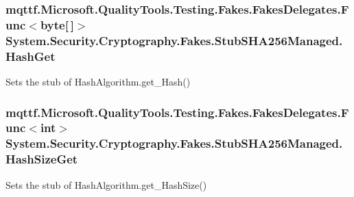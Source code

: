 \hypertarget{class_system_1_1_security_1_1_cryptography_1_1_fakes_1_1_stub_s_h_a256_managed_a1be8ff104c2db244d0a3ebaa54e890dd}{
\subsubsection[{Hash\-Get}]{\setlength{\rightskip}{0pt plus 5cm}mqttf.\-Microsoft.\-Quality\-Tools.\-Testing.\-Fakes.\-Fakes\-Delegates.\-Func$<$byte\mbox{[}$\,$\mbox{]}$>$ System.\-Security.\-Cryptography.\-Fakes.\-Stub\-S\-H\-A256\-Managed.\-Hash\-Get}}\label{class_system_1_1_security_1_1_cryptography_1_1_fakes_1_1_stub_s_h_a256_managed_a1be8ff104c2db244d0a3ebaa54e890dd}


Sets the stub of Hash\-Algorithm.\-get\-\_\-\-Hash()

\hypertarget{class_system_1_1_security_1_1_cryptography_1_1_fakes_1_1_stub_s_h_a256_managed_a9a023a51c84e9a9acf4239e1e06cdc97}{
\subsubsection[{Hash\-Size\-Get}]{\setlength{\rightskip}{0pt plus 5cm}mqttf.\-Microsoft.\-Quality\-Tools.\-Testing.\-Fakes.\-Fakes\-Delegates.\-Func$<$int$>$ System.\-Security.\-Cryptography.\-Fakes.\-Stub\-S\-H\-A256\-Managed.\-Hash\-Size\-Get}}\label{class_system_1_1_security_1_1_cryptography_1_1_fakes_1_1_stub_s_h_a256_managed_a9a023a51c84e9a9acf4239e1e06cdc97}


Sets the stub of Hash\-Algorithm.\-get\-\_\-\-Hash\-Size()

